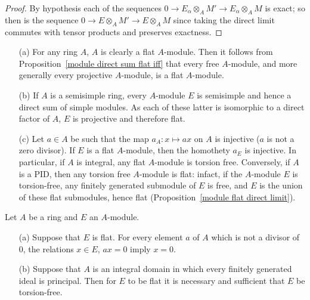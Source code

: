 \begin{proof}
By hypothesis each of the sequences $0\to E_\alpha\otimes_AM'\to E_\alpha\otimes_AM$ is exact; so then is the sequence $0\to E\otimes_AM'\to E\otimes_AM$ since taking the direct limit commutes with tensor products and preserves exactness.
\end{proof}
\begin{example}
\mbox{}
\begin{itemize}
\item[(a)] For any ring $A$, $A$ is clearly a flat $A$-module. Then it follows from Proposition~\ref{module direct sum flat iff} that every free $A$-module, and more generally every projective $A$-module, is a flat $A$-module.
\item[(b)] If $A$ is a semisimple ring, every $A$-module $E$ is semisimple and hence a direct sum of simple modules. As each of these latter is isomorphic to a direct factor of $A$, $E$ is projective and therefore flat.
\item[(c)] Let $a\in A$ be such that the map $a_A:x\mapsto ax$ on $A$ is injective ($a$ is not a zero divisor). If $E$ is a flat $A$-module, then the homothety $a_E$ is injective. In particular, if $A$ is integral, any flat $A$-module is torsion free. Conversely, if $A$ is a PID, then any torsion free $A$-module is flat: infact, if the $A$-module $E$ is torsion-free, any finitely generated submodule of $E$ is free, and $E$ is the union of these flat submodules, hence flat (Proposition~\ref{module flat direct limit}).
\end{itemize}
\end{example}
\begin{proposition}\label{module flat and torsion}
Let $A$ be a ring and $E$ an $A$-module.
\begin{itemize}
\item[(a)] Suppose that $E$ is flat. For every element $a$ of $A$ which is not a divisor of $0$, the relations $x\in E$, $ax=0$ imply $x=0$. 
\item[(b)] Suppose that $A$ is an integral domain in which every finitely generated ideal is principal. Then for $E$ to be flat it is necessary and sufficient that $E$ be torsion-free.
\end{itemize}
\end{proposition}
